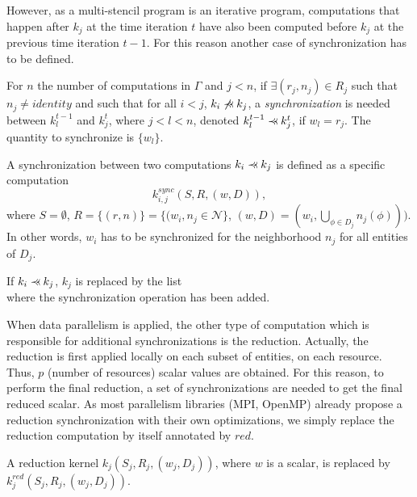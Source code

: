 However, as a multi-stencil program is an iterative program, computations that happen after $k_j$ at the time iteration $t$ have also been computed before $k_j$ at the previous time iteration $t-1$. For this reason another case of synchronization has to be defined.

\begin{mydef}
For $n$ the number of computations in $\Gamma$ and $j<n$, if $\exists (r_j,n_j) \in R_j$ such that $n_j\neq identity$ and such that for all $i<j$, $k_i \not \pprec k_j$, a \textit{synchronization} is needed between $k_l^{t-1}$ and $k_j^t$, where $j<l<n$, denoted $k_l^{t-1} \pprec k_j^{t}$, if $w_l=r_j$. The quantity to synchronize is $\{w_l\}$.
\label{def:sync2}
\end{mydef}

\begin{mydef}
A synchronization between two computations $k_i \pprec k_j$ is defined as a specific computation 
\begin{equation*}
k_{i,j}^{sync}(S,R,(w,D)), 
\end{equation*}
where $S=\emptyset$, $R=\{(r,n)\}=\{(w_i,n_j \in \mathcal{N}\}$, $(w,D)=(w_i,\bigcup_{\phi \in D_j} n_j(\phi)))$. In other words, $w_i$ has to be synchronized for the neighborhood $n_j$ for all entities of $D_j$.
\label{def:sync3}
\end{mydef}

\begin{mydef}
If $k_i \pprec k_j$, $k_j$ is replaced by the list
\begin{equation*}
[k_{i,j}^{sync}, k_j]
\end{equation*}
where the synchronization operation has been added.
\end{mydef}

When data parallelism is applied, the other type of computation which is responsible for additional synchronizations is the reduction. Actually, the reduction is first applied locally on each subset of entities, on each resource. Thus, $p$ (number of resources) scalar values are obtained. For this reason, to perform the final reduction, a set of synchronizations are needed to get the final reduced scalar. As most parallelism libraries (MPI, OpenMP) already propose a reduction synchronization with their own optimizations, we simply replace the reduction computation by itself annotated by $red$.

\begin{mydef}
A reduction kernel $k_j(S_j,R_j,(w_j,D_j))$, where $w$ is a scalar, is replaced by $k^{red}_j(S_j,R_j,(w_j,D_j))$.
\label{def:red}
\end{mydef}

